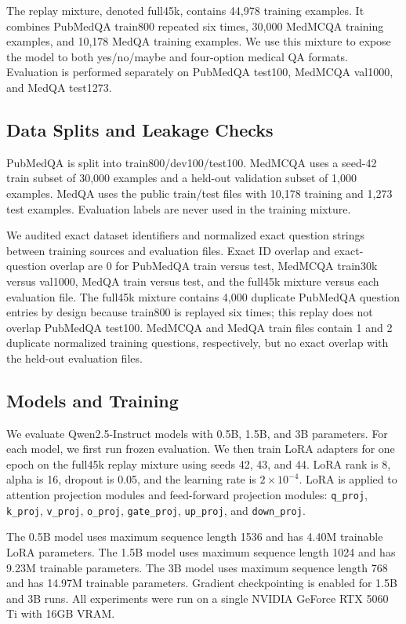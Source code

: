 \documentclass[11pt]{article}
\begin{document}
The replay mixture, denoted full45k, contains 44,978 training examples. It combines PubMedQA train800 repeated six times, 30,000 MedMCQA training examples, and 10,178 MedQA training examples. We use this mixture to expose the model to both yes/no/maybe and four-option medical QA formats. Evaluation is performed separately on PubMedQA test100, MedMCQA val1000, and MedQA test1273.

\subsection{Data Splits and Leakage Checks}

PubMedQA is split into train800/dev100/test100. MedMCQA uses a seed-42 train subset of 30,000 examples and a held-out validation subset of 1,000 examples. MedQA uses the public train/test files with 10,178 training and 1,273 test examples. Evaluation labels are never used in the training mixture.

We audited exact dataset identifiers and normalized exact question strings between training sources and evaluation files. Exact ID overlap and exact-question overlap are 0 for PubMedQA train versus test, MedMCQA train30k versus val1000, MedQA train versus test, and the full45k mixture versus each evaluation file. The full45k mixture contains 4,000 duplicate PubMedQA question entries by design because train800 is replayed six times; this replay does not overlap PubMedQA test100. MedMCQA and MedQA train files contain 1 and 2 duplicate normalized training questions, respectively, but no exact overlap with the held-out evaluation files.

\subsection{Models and Training}

We evaluate Qwen2.5-Instruct models with 0.5B, 1.5B, and 3B parameters. For each model, we first run frozen evaluation. We then train LoRA adapters for one epoch on the full45k replay mixture using seeds 42, 43, and 44. LoRA rank is 8, alpha is 16, dropout is 0.05, and the learning rate is $2\times 10^{-4}$. LoRA is applied to attention projection modules and feed-forward projection modules: \texttt{q\_proj}, \texttt{k\_proj}, \texttt{v\_proj}, \texttt{o\_proj}, \texttt{gate\_proj}, \texttt{up\_proj}, and \texttt{down\_proj}.

The 0.5B model uses maximum sequence length 1536 and has 4.40M trainable LoRA parameters. The 1.5B model uses maximum sequence length 1024 and has 9.23M trainable parameters. The 3B model uses maximum sequence length 768 and has 14.97M trainable parameters. Gradient checkpointing is enabled for 1.5B and 3B runs. All experiments were run on a single NVIDIA GeForce RTX 5060 Ti with 16GB VRAM.
\end{document}
